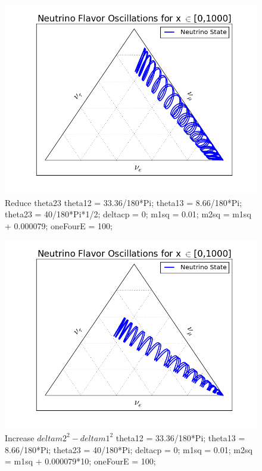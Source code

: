 \documentclass{tufte-handout}
\begin{document}
\begin{figure}
\centering
\includegraphics{assets/ternary/1000-4}
\caption{ Reduce theta23 \newline
theta12 = 33.36/180*Pi;\newline
theta13 = 8.66/180*Pi;\newline
theta23 = 40/180*Pi*1/2;\newline
deltacp = 0;\newline
m1sq = 0.01;\newline
m2sq = m1sq + 0.000079;\newline
oneFourE = 100; 
}
\end{figure}



\begin{figure}
\centering
\includegraphics{assets/ternary/1000-3}
\caption{ Increase $deltam2^2-deltam1^2$\newline
theta12 = 33.36/180*Pi;\newline
theta13 = 8.66/180*Pi;\newline
theta23 = 40/180*Pi;\newline
deltacp = 0;\newline
m1sq = 0.01;\newline
m2sq = m1sq + 0.000079*10;\newline
oneFourE = 100; 
}
\end{figure}
\end{document}
